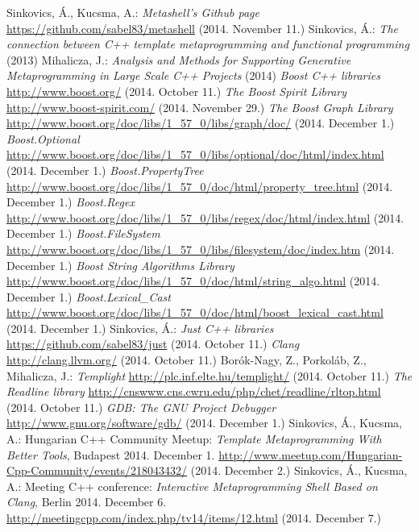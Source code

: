 \documentclass[a4paper,12pt]{report}
\begin{document}
\begin{thebibliography}{99}
    Sinkovics, Á., Kucsma, A.:
    \textit{Metashell's Github page}
    \url{https://github.com/sabel83/metashell} (2014. November 11.)
    Sinkovics, Á.:
    \textit{The connection between C++ template metaprogramming and functional
    programming} (2013)
    Mihalicza, J.:
    \textit{Analysis and Methods for Supporting Generative Metaprogramming in
    Large Scale C++ Projects} (2014)
    \textit{Boost C++ libraries}
    \url{http://www.boost.org/} (2014. October 11.)
    \textit{The Boost Spirit Library}
    \url{http://www.boost-spirit.com/} (2014. November 29.)
    \textit{The Boost Graph Library}
    \url{http://www.boost.org/doc/libs/1_57_0/libs/graph/doc/}
    (2014. December 1.)
    \textit{Boost.Optional}
    \url{http://www.boost.org/doc/libs/1_57_0/libs/optional/doc/html/index.html}
    (2014. December 1.)
    \textit{Boost.PropertyTree}
    \url{http://www.boost.org/doc/libs/1_57_0/doc/html/property_tree.html}
    (2014. December 1.)
    \textit{Boost.Regex}
    \url{http://www.boost.org/doc/libs/1_57_0/libs/regex/doc/html/index.html}
    (2014. December 1.)
    \textit{Boost.FileSystem}
    \url{http://www.boost.org/doc/libs/1_57_0/libs/filesystem/doc/index.htm}
    (2014. December 1.)
    \textit{Boost String Algorithms Library}
    \url{http://www.boost.org/doc/libs/1_57_0/doc/html/string_algo.html}
    (2014. December 1.)
    \textit{Boost.Lexical\_Cast}
    \url{http://www.boost.org/doc/libs/1_57_0/doc/html/boost_lexical_cast.html}
    (2014. December 1.)
    Sinkovics, Á.:
    \textit{Just C++ libraries}
    \url{https://github.com/sabel83/just} (2014. October 11.)
    \textit{Clang}
    \url{http://clang.llvm.org/} (2014. October 11.)
    Borók-Nagy, Z., Porkoláb, Z., Mihalicza, J.:
    \textit{Templight}
    \url{http://plc.inf.elte.hu/templight/} (2014. October 11.)
    \textit{The Readline library}
    \url{http://cnswww.cns.cwru.edu/php/chet/readline/rltop.html}
    (2014. October 11.)
    \textit{GDB: The GNU Project Debugger}
    \url{http://www.gnu.org/software/gdb/}
    (2014. December 1.)
    Sinkovics, Á., Kucsma, A.:
    Hungarian C++ Community Meetup:
    \textit{Template Metaprogramming With Better Tools}, Budapest 2014.
    December 1.
    \url{http://www.meetup.com/Hungarian-Cpp-Community/events/218043432/}
    (2014. December 2.)
    Sinkovics, Á., Kucsma, A.:
    Meeting C++ conference:
    \textit{Interactive Metaprogramming Shell Based on Clang}, Berlin 2014.
    December 6.
    \url{http://meetingcpp.com/index.php/tv14/items/12.html}
    (2014. December 7.)
\end{thebibliography}
\end{document}
